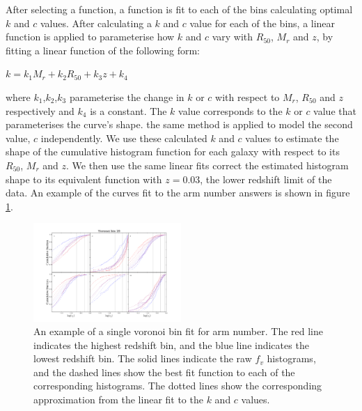 \documentclass[useAMS,usenatbib]{mn2e}
\begin{document}
After selecting a function, a function is fit to each of the bins calculating optimal $k$ and $c$ values. After calculating a $k$ and $c$ value for each of the bins, a linear function is applied to parameterise how $k$ and $c$ vary with $R_{50}$, $M_r$ and $z$, by fitting a linear function of the following form:

\begin{center}
$k = k_1M_r + k_2R_{50} +k_3z + k_4$
\end{center}

where $k_1$,$k_2$,$k_3$ parameterise the change in $k$ or $c$ with respect to $M_r$, $R_{50}$ and $z$ respectively and $k_4$ is a constant. The $k$ value corresponds to the $k$ or $c$ value that parameterises the curve's shape. the same method is applied to model the second value, $c$ independently. We use these calculated $k$ and $c$ values to estimate the shape of the cumulative histogram function for each galaxy with respect to its $R_{50}$, $M_r$ and $z$. We then use the same linear fits  correct the estimated histogram shape to its equivalent function with $z=0.03$, the lower redshift limit of the data. An example of the curves fit to the arm number answers is shown in figure \ref{fig:function_fit}.

\begin{figure}
		\centering

        \includegraphics[width=0.5\textwidth]{Data_imgs/fit_t11_arms_number_vbin20_kcfit1.pdf}

        \caption{An example of a single voronoi bin fit for arm number. The red line indicates the highest redshift bin, and the blue line indicates the lowest redshift bin. The solid lines indicate the raw $f_v$ histograms, and the dashed lines show the best fit function to each of the corresponding histograms. The dotted lines show the corresponding approximation from the linear fit to the $k$ and $c$ values.}

        \label{fig:function_fit}

\end{figure}
\end{document}
